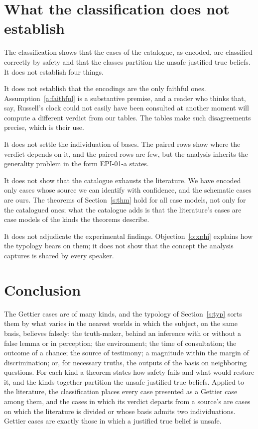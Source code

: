 \documentclass{situationist-preprint}
\begin{document}
\section{What the classification does not establish}\label{s:not}

The classification shows that the cases of the catalogue, as encoded, are classified correctly by safety and that the classes partition the unsafe justified true beliefs. It does not establish four things.

It does not establish that the encodings are the only faithful ones. Assumption~\ref{a:faithful} is a substantive premise, and a reader who thinks that, say, Russell's clock could not easily have been consulted at another moment will compute a different verdict from our tables. The tables make such disagreements precise, which is their use.

It does not settle the individuation of bases. The paired rows show where the verdict depends on it, and the paired rows are few, but the analysis inherits the generality problem in the form EPI-01-a states.

It does not show that the catalogue exhausts the literature. We have encoded only cases whose source we can identify with confidence, and the schematic cases are ours. The theorems of Section~\ref{s:thm} hold for all case models, not only for the catalogued ones; what the catalogue adds is that the literature's cases are case models of the kinds the theorems describe.

It does not adjudicate the experimental findings. Objection~\ref{o:xphi} explains how the typology bears on them; it does not show that the concept the analysis captures is shared by every speaker.

\section{Conclusion}

The Gettier cases are of many kinds, and the typology of Section~\ref{s:typ} sorts them by what varies in the nearest worlds in which the subject, on the same basis, believes falsely: the truth-maker, behind an inference with or without a false lemma or in perception; the environment; the time of consultation; the outcome of a chance; the source of testimony; a magnitude within the margin of discrimination; or, for necessary truths, the outputs of the basis on neighboring questions. For each kind a theorem states how safety fails and what would restore it, and the kinds together partition the unsafe justified true beliefs. Applied to the literature, the classification places every case presented as a Gettier case among them, and the cases in which its verdict departs from a source's are cases on which the literature is divided or whose basis admits two individuations. Gettier cases are exactly those in which a justified true belief is unsafe.
\end{document}
